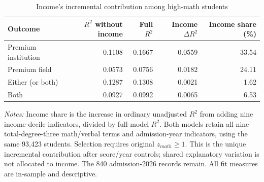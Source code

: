 \begin{table}[!htbp]\centering
\caption{Income's incremental contribution among high-math students}
\label{tab:high-math-main-cubic-income-contribution}
\small
\begin{tabular}{lrrrr}\hline\hline
Outcome & $R^2$ without income & Full $R^2$ & Income $\Delta R^2$ & Income share (\%) \\ \hline
Premium institution & 0.1108 & 0.1667 & 0.0559 & 33.54 \\
Premium field & 0.0573 & 0.0756 & 0.0182 & 24.11 \\
Either (or both) & 0.1287 & 0.1308 & 0.0021 & 1.62 \\
Both & 0.0927 & 0.0992 & 0.0065 & 6.53 \\
\hline\hline\end{tabular}
\begin{minipage}{0.98\textwidth}\footnotesize
\textit{Notes:} Income share is the increase in ordinary unadjusted $R^2$ from adding nine income-decile indicators, divided by full-model $R^2$. Both models retain all nine total-degree-three math/verbal terms and admission-year indicators, using the same 93,423 students. Selection requires original $z_{math} \geq 1$. This is the unique incremental contribution after score/year controls; shared explanatory variation is not allocated to income. The 840 admission-2026 records remain. All fit measures are in-sample and descriptive.
\end{minipage}
\end{table}
